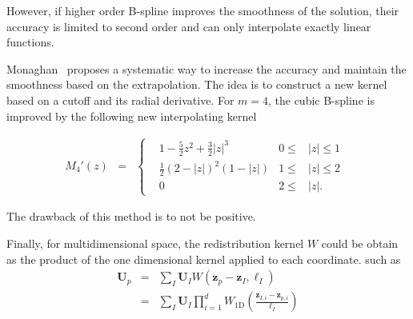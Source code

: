 However, if higher order B-spline improves the smoothness of the solution, their accuracy is limited to second order and can only interpolate exactly linear functions.

Monaghan~\cite{monaghan_extrapolating_1985} proposes a systematic way to increase the accuracy and maintain the smoothness based on the extrapolation. The idea is to construct a new kernel based on a cutoff and its radial derivative. For $m = 4$, the cubic B-spline is improved by the following new interpolating kernel

\begin{eqnarray*}~\label{cubic_radial_kernel}
	M_4'(z) &=& \left\{ \begin{aligned}
		 & 1 - \frac{5}{2}z^2 + \frac{3}{2} |z|^3 & 0 \leq & |z| \leq  1 & \\
		 & \frac{1}{2}{(2 - |z|)}^2(1 - |z|)      & 1 \leq & |z| \leq 2  & \\
		 & 0                                      & 2 \leq & |z|.
	\end{aligned}
	\right.
\end{eqnarray*}

The drawback of this method is to not be positive.

Finally, for multidimensional space, the redistribution kernel $W$ could be obtain as the product of the one dimensional kernel applied to each coordinate.
such as
\begin{eqnarray*}
	\bm U_p &=& \sum_I \bm U_I  W \left(\bm z_p - \bm z_I, \ell_I \right) \\
	&=&  \sum_I \bm U_I  \prod_{i = 1}^d W_{1\text{D}} \left(\frac{\bm z_{I, i} - \bm z_{p, i}}{\ell_I} \right)
\end{eqnarray*}